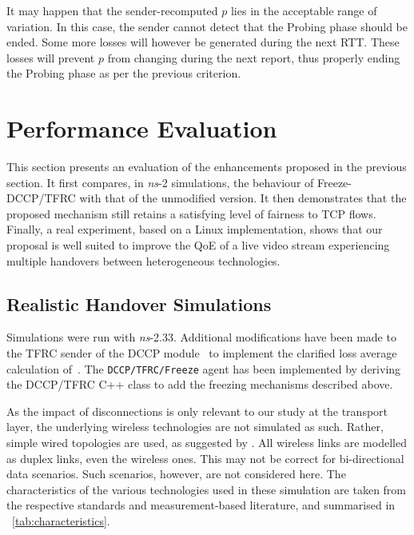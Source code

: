 \documentclass[twocolumn]{nictatechreport}
\newcommand{\ns}{\textit{ns}}
\begin{document}
It may happen that the sender-recomputed $p$ lies in the acceptable range of
variation. In this case, the sender cannot detect that the Probing phase should
be ended. Some more losses will however be generated during the next RTT. These
losses will prevent $p$ from changing during the next report, thus properly
ending the Probing phase as per the previous criterion.

\section{Performance Evaluation}
\label{freezetfrc:performance}

This section  presents an evaluation of the enhancements proposed in the
previous section. It first compares, in \ns-2 simulations, the behaviour of
Freeze-DCCP/TFRC with that of the unmodified version. It then demonstrates that
the proposed mechanism still retains a satisfying level of fairness to TCP
flows.  Finally, a real experiment, based on a Linux implementation, shows that
our proposal is well suited to improve the QoE of a live video stream
experiencing multiple handovers between heterogeneous technologies.

\subsection{Realistic Handover Simulations}
\label{realistic}

Simulations were run with \ns-2.33. Additional modifications have been made to
the TFRC sender of the DCCP module~\cite{2004mattsson_dccp_ns2} to implement
the clarified loss average calculation of~\cite{rfc5348}. The
\verb#DCCP/TFRC/Freeze# agent has been implemented by deriving the DCCP/TFRC
C++ class to add the freezing mechanisms described above.

As the impact of disconnections is only relevant to our study at the transport
layer, the underlying wireless technologies are not simulated as such. Rather,
simple wired topologies are used, as suggested by
\cite{2004gurtov_modelling_wireless}. All wireless links are modelled as duplex
links, even the wireless ones. This may not be correct for bi-directional data
scenarios. Such scenarios, however, are not considered here. The
characteristics of the various technologies used in these simulation are taken
from the respective standards and measurement-based literature, and summarised in
\tablename~\ref{tab:characteristics}.
\end{document}
